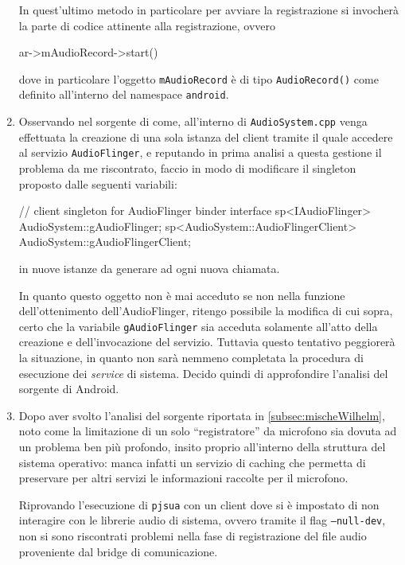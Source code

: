 \begin{enumerate}
	In quest'ultimo metodo in particolare per avviare la registrazione
	si invocherà la parte di codice attinente alla registrazione, ovvero
\begin{clang}
ar->mAudioRecord->start()
\end{clang}
	dove in particolare l'oggetto \texttt{\small mAudioRecord} è di tipo
	\texttt{AudioRecord()} come definito all'interno del namespace \texttt{\small android}.
	

\item Osservando  nel sorgente di come, all'interno di \texttt{\small AudioSystem.cpp}
	venga effettuata la creazione di una sola istanza del client tramite il 
	quale accedere al servizio \texttt{\small AudioFlinger}, e reputando in
	prima analisi a questa gestione il problema da me riscontrato, faccio in
	modo di modificare il singleton proposto dalle seguenti variabili:
\begin{cpp}
// client singleton for AudioFlinger binder interface
sp<IAudioFlinger> AudioSystem::gAudioFlinger;
sp<AudioSystem::AudioFlingerClient> AudioSystem::gAudioFlingerClient;
\end{cpp}
	in nuove istanze da generare ad ogni nuova chiamata.
	
	
	In quanto questo oggetto non è mai acceduto se non nella funzione dell'ottenimento
	dell'AudioFlinger, ritengo possibile la modifica di cui sopra,  certo che la variabile
	\texttt{\small gAudioFlinger} sia acceduta solamente all'atto della creazione
	e dell'invocazione del servizio. Tuttavia questo tentativo peggiorerà
	la situazione, in quanto non sarà nemmeno completata la procedura di 
	esecuzione dei \textit{service} di sistema. Decido quindi di approfondire
	l'analisi del sorgente di Android.

\item Dopo aver svolto l'analisi del sorgente riportata in \vref{subsec:mischeWilhelm},
	noto come la limitazione di un solo ``registratore'' da microfono sia 
	dovuta ad un problema ben più profondo, insito proprio all'interno
	della struttura del sistema operativo: manca infatti un servizio di 
	caching che permetta di preservare per altri servizi le informazioni
	raccolte per il microfono.
	
	Riprovando l'esecuzione di \texttt{\small pjsua} con un client dove si è
	impostato di non interagire con le librerie audio di sistema, ovvero
	tramite il flag \texttt{\small --null-dev}, non si sono riscontrati problemi
	nella fase di registrazione del file audio proveniente dal bridge di 
	comunicazione.

\end{enumerate}

